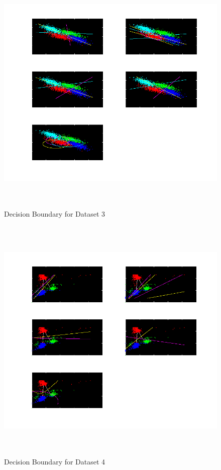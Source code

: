 \documentclass[11pt,a4paper]{article}
\begin{document}
\begin{figure}[H]
	\includegraphics[height=12cm]{Figures/OD_DB.png}
	\caption{Decision Boundary for Dataset 3}
\end{figure}

\begin{figure}[H]
	\includegraphics[height=12cm]{Figures/RWD_DB.png}
	\caption{Decision Boundary for Dataset 4}
\end{figure}
\end{document}
